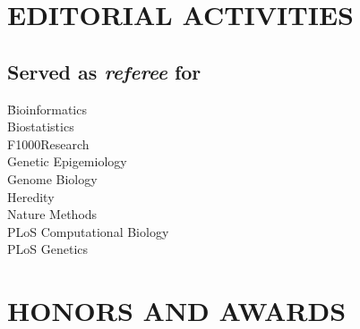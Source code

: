\documentclass[11pt,letterpaper,pdf]{article}
\begin{document}

\section*{EDITORIAL ACTIVITIES}

\subsection*{Served as \textit{referee} for}

\begin{tabbing}
  \=Bioinformatics\\
  \>Biostatistics\\
  \>F1000Research\\
  \>Genetic Epigemiology\\
  \>Genome Biology\\
  \>Heredity\\
  \>Nature Methods\\
  \>PLoS Computational Biology\\
  \>PLoS Genetics\\
\end{tabbing}

\section*{HONORS AND AWARDS}

\end{document}
